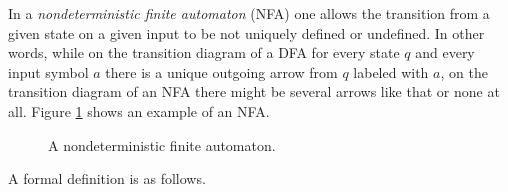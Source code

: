 

\setcounter{section}{1}
\setcounter{subsection}{3}
\setcounter{dfn}{5}

In a \emph{nondeterministic finite automaton} (NFA) one allows the transition from a given state on a given input to be not uniquely defined or undefined.
In other words, while on the transition diagram of a DFA for every state $q$ and every input symbol $a$ there is a unique outgoing arrow from $q$ labeled with $a$,
on the transition diagram of an NFA there might be several arrows like that or none at all.
Figure \ref{fig:NFA} shows an example of an NFA.

\begin{figure}[htb]
\begin{center}

\end{center}
\caption{A nondeterministic finite automaton.}
\label{fig:NFA}
\end{figure}

A formal definition is as follows.


